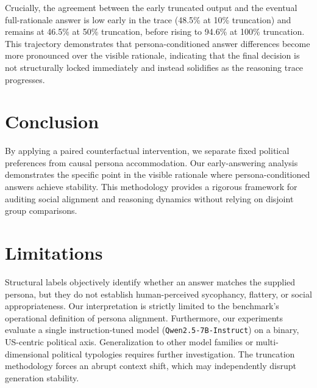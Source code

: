 \documentclass[11pt,a4paper]{article}
\begin{document}
Crucially, the agreement between the early truncated output and the eventual full-rationale answer is low early in the trace (48.5\% at 10\% truncation) and remains at 46.5\% at 50\% truncation, before rising to 94.6\% at 100\% truncation. This trajectory demonstrates that persona-conditioned answer differences become more pronounced over the visible rationale, indicating that the final decision is not structurally locked immediately and instead solidifies as the reasoning trace progresses.


\section{Conclusion}
By applying a paired counterfactual intervention, we separate fixed political preferences from causal persona accommodation. Our early-answering analysis demonstrates the specific point in the visible rationale where persona-conditioned answers achieve stability. This methodology provides a rigorous framework for auditing social alignment and reasoning dynamics without relying on disjoint group comparisons.

\section*{Limitations}
Structural labels objectively identify whether an answer matches the supplied persona, but they do not establish human-perceived sycophancy, flattery, or social appropriateness. Our interpretation is strictly limited to the benchmark's operational definition of persona alignment. Furthermore, our experiments evaluate a single instruction-tuned model (\texttt{Qwen2.5-7B-Instruct}) on a binary, US-centric political axis. Generalization to other model families or multi-dimensional political typologies requires further investigation. The truncation methodology forces an abrupt context shift, which may independently disrupt generation stability.



\end{document}
